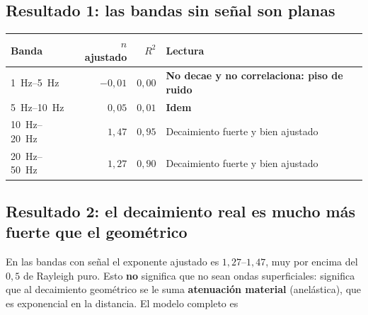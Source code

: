 \subsection{Resultado 1: las bandas sin se\~nal son planas}

\begin{center}\footnotesize
\begin{tabular}{@{}lrrl@{}}
\toprule
Banda & $n$ ajustado & $R^{2}$ & Lectura \\
\midrule
\SIrange{1}{5}{\hertz}   & $-0{,}01$ & $0{,}00$ & \textbf{No decae y no correlaciona: piso de ruido} \\
\SIrange{5}{10}{\hertz}  & $0{,}05$  & $0{,}01$ & \textbf{Idem} \\
\SIrange{10}{20}{\hertz} & $1{,}47$  & $0{,}95$ & Decaimiento fuerte y bien ajustado \\
\SIrange{20}{50}{\hertz} & $1{,}27$  & $0{,}90$ & Decaimiento fuerte y bien ajustado \\
\bottomrule
\end{tabular}
\end{center}


\subsection{Resultado 2: el decaimiento real es mucho m\'as fuerte que el
geom\'etrico}

En las bandas con se\~nal el exponente ajustado es $1{,}27$--$1{,}47$, muy por
encima del $0{,}5$ de Rayleigh puro. Esto \textbf{no} significa que no sean ondas
superficiales: significa que al decaimiento geom\'etrico se le suma
\textbf{atenuaci\'on material} (anel\'astica), que es exponencial en la
distancia. El modelo completo es

